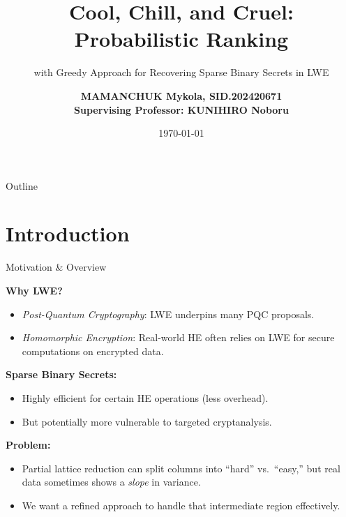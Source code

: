 \documentclass{beamer}
\title[Intro / CCC-PRGR for LWE]{Cool, Chill, and Cruel: Probabilistic Ranking}
\subtitle{with Greedy Approach for Recovering Sparse Binary Secrets in LWE}
\author[Mamanchuk Mykola]{\textbf{MAMANCHUK Mykola, SID.202420671} \\ \textbf{Supervising Professor: KUNIHIRO Noboru}}
\institute[UoT, CRISEC]{University of Tsukuba \\ Cryptography and Information Security Laboratory}
\date{\today}
\begin{document}
\begin{frame}
  \titlepage
\end{frame}

\begin{frame}{Outline}
  \tableofcontents
\end{frame}


\section{Introduction}

\begin{frame}{Motivation \& Overview}

  \textbf{Why LWE?}
  \begin{itemize}
    \item \emph{Post-Quantum Cryptography}: LWE underpins many PQC proposals.
    \item \emph{Homomorphic Encryption}: Real-world HE often relies on LWE for secure computations on encrypted data.
  \end{itemize}

  \textbf{Sparse Binary Secrets:}
  \begin{itemize}
    \item Highly efficient for certain HE operations (less overhead).
    \item But potentially more vulnerable to targeted cryptanalysis.
  \end{itemize}

  \textbf{Problem:}
  \begin{itemize}
    \item Partial lattice reduction can split columns into “hard” vs.\ “easy,” but real data sometimes shows a \emph{slope} in variance.
    \item We want a refined approach to handle that intermediate region effectively.
  \end{itemize}
\end{frame}
\end{document}

